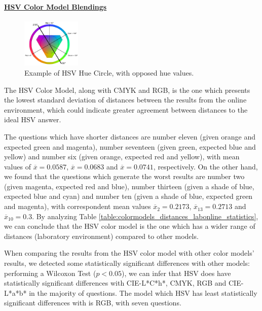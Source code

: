 \paragraph{\ul{HSV Color Model Blendings}} \par
\label{par:hsvcolormodel}
%
\begin{figure}
	\centering
    \vspace{-\baselineskip}
	  \includegraphics[width=0.25\textwidth]{images/results/HSV_hue.png}
    \caption[Example of HSV Hue Circle, with opposed hue values.]{Example of HSV Hue Circle, with opposed hue values.}
    \label{fig:hsvcircles_example}
\end{figure}
%
The HSV Color Model, along with CMYK and RGB, is the one which presents the lowest standard deviation of distances between the results from the online environment, which could indicate greater agreement between distances
 to the ideal HSV answer. \par
%
The questions which have shorter distances are number eleven (given orange and expected green and magenta), number seventeen (given green, expected blue and yellow) and number six (given orange,
expected red and yellow), with mean values of $\overline{x} = 0.0587$, $\overline{x} = 0.0683$ and $\overline{x} = 0.0741$, respectively.
On the other hand, we found that the questions which generate the worst results are number two (given magenta, expected red and blue), number thirteen (given a shade of blue, expected blue and cyan) and number
ten (given a shade of blue, expected green and magenta), with correspondent mean values $\overline{x}_{2} = 0.2173$, $\overline{x}_{13} = 0.2713$ and
$\overline{x}_{10} = 0.3$.
By analyzing Table \ref{table:colormodels_distances_labonline_statistics}, we can conclude that the HSV color model is the one which has a wider range of distances (laboratory environment) compared to other models. \par
%
When comparing the results from the HSV color model with other color models' results, we detected some statistically significant differences with other models: performing a Wilcoxon Test ($p < 0.05$), we can infer that HSV does
have statistically significant differences with CIE-L*C*h*, CMYK, RGB and CIE-L*a*b* in the majority of questions. The model which HSV has least statistically significant differences with is RGB, with seven questions. \par
